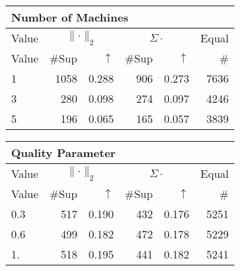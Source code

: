 \begin{center}
\renewcommand{\tabcolsep}{4pt}
\renewcommand{\arraystretch}{1.1}
\begin{customnormal}
\begin{tabular}{lrrrrr}
\multicolumn{6}{l}{Number of Machines}\\
\toprule
\multicolumn{1}{c}{Value} & \multicolumn{2}{c}{$\lVert \cdot \rVert_2$} & \multicolumn{2}{c}{$\Sigma \cdot$} & \multicolumn{1}{c}{Equal} \\ 
\cmidrule(lr){1-1} \cmidrule(lr){2-3} \cmidrule(lr){4-5}  \cmidrule(lr){6-6}
Value & \#Sup & $\uparrow$ & \#Sup & $\uparrow$ & \# \\ 
\midrule
1 & 1058 & 0.288 & 906 & 0.273 & 7636 \\ 
3 & 280 & 0.098 & 274 & 0.097 & 4246 \\ 
5 & 196 & 0.065 & 165 & 0.057 & 3839 \\ 
\bottomrule
\end{tabular}


\end{customnormal}
\end{center}
\begin{center}
\renewcommand{\tabcolsep}{4pt}
\renewcommand{\arraystretch}{1.1}
\begin{customnormal}
\begin{tabular}{lrrrrr}
\multicolumn{6}{l}{Quality Parameter}\\
\toprule
\multicolumn{1}{c}{Value} & \multicolumn{2}{c}{$\lVert \cdot \rVert_2$} & \multicolumn{2}{c}{$\Sigma \cdot$} & \multicolumn{1}{c}{Equal} \\ 
\cmidrule(lr){1-1} \cmidrule(lr){2-3} \cmidrule(lr){4-5}  \cmidrule(lr){6-6}
Value & \#Sup & $\uparrow$ & \#Sup & $\uparrow$ & \# \\ 
\midrule
0.3 & 517 & 0.190 & 432 & 0.176 & 5251 \\ 
0.6 & 499 & 0.182 & 472 & 0.178 & 5229 \\ 
1. & 518 & 0.195 & 441 & 0.182 & 5241 \\ 
\bottomrule
\end{tabular}


\end{customnormal}
\end{center}
